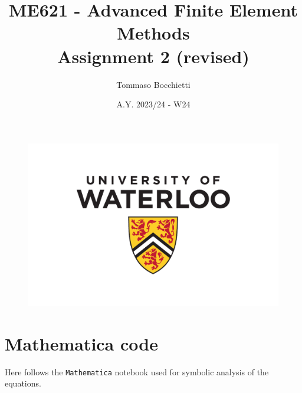\documentclass{../../commons/assignment}
\begin{document}
\graphicspath{{./img/}}


\title{ME621 - Advanced Finite Element Methods \\ Assignment 2 (revised)}
\author{Tommaso Bocchietti}
\date{A.Y. 2023/24 - W24}

\maketitle

\begin{figure}[H]
    \centering
    \includegraphics[width=.9\textwidth]{./pdf/UniversityOfWaterloo_logo_vert_pms}
    \label{fig:University_Of_Waterloo_logo}
\end{figure}

\clearpage
\tableofcontents
\listoffigures
\listoftables
\clearpage








\clearpage
\appendix
\section{Mathematica code}
\label{sec:appendix}

Here follows the \texttt{Mathematica} notebook used for symbolic analysis of the equations.


\end{document}
